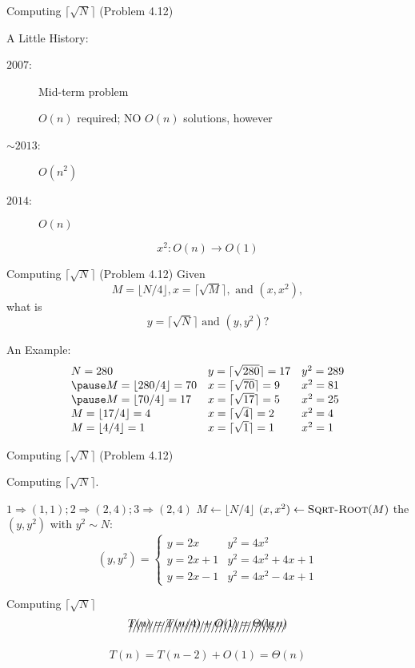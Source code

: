 \begin{frame}{Computing $\lceil \sqrt{N} \rceil$ (Problem 4.12)}
  \begin{block}{A Little History:}
    \begin{description}
	  \item[$2007$:] Mid-term problem \\
		\centerline{$O(n)$ required; NO $O(n)$ solutions, however}
	  \item[$\sim 2013$:] $O(n^2)$
	  \pause
	  \item[$2014$:] $O(n)$
    \end{description}
  \end{block}

  \pause
  \[
	x^2: O(n) \to O(1)
  \]
\end{frame}
\begin{frame}{Computing $\lceil \sqrt{N} \rceil$ (Problem 4.12)}
  Given
  \[ M = \lfloor N/4 \rfloor, x = \lceil \sqrt{M} \rceil,
    \textrm{ and } (x, x^2),
  \]
  what is
  \[ y = \lceil \sqrt{N} \rceil \textrm{ and } (y, y^2)? \]

  \pause
  \begin{exampleblock}{An Example:}
  \[
	\begin{array}{lll}
	  N = 280 & y = \lceil \sqrt{280} \rceil = 17 & y^2 = 289 \\ \pause
	  M = \lfloor 280/4 \rfloor = 70 & x = \lceil \sqrt{70} \rceil = 9 & x^2 = 81 \\ \pause
	  M = \lfloor 70/4 \rfloor = 17 & x = \lceil \sqrt{17} \rceil = 5 & x^2 = 25 \\
	  M = \lfloor 17/4 \rfloor = 4 & x = \lceil \sqrt{4} \rceil = 2 & x^2 = 4 \\
	  M = \lfloor 4/4 \rfloor = 1 & x = \lceil \sqrt{1} \rceil = 1 & x^2 = 1
	\end{array}
  \]
  \end{exampleblock}
\end{frame}
\begin{frame}{Computing $\lceil \sqrt{N} \rceil$ (Problem 4.12)}
  \begin{algorithm}[H]
    \caption{Computing $\lceil \sqrt{N} \rceil$.}
    \begin{algorithmic}[]
	      \State \Return $1 \Rightarrow (1,1); 2 \Rightarrow (2,4); 3 \Rightarrow (2,4)$
	    \EndIf
	    \State $M \gets \lfloor N/4 \rfloor$
	    \State $(x, x^2) \gets \textsc{Sqrt-Root}{(M)}$
		\State \Return the $(y, y^2)$ with $y^2 \sim N$:
           \[
			(y, y^2) = \left\{ \begin{array}{ll}
			y = 2x & y^2 = 4x^2 \\
			y = 2x + 1 & y^2 = 4x^2 + 4x + 1 \\
			y = 2x - 1 & y^2 = 4x^2 - 4x + 1
			\end{array} \right.
	      \]
	  \EndProcedure
    \end{algorithmic}
  \end{algorithm}
\end{frame}
\begin{frame}{Computing $\lceil \sqrt{N} \rceil$}
  \[ \xout{T(n) = T(n/4) + O(1) = \Theta(\lg n)} \]

  \[ T(n) = T(n - 2) + O(1) = \Theta(n) \]
\end{frame}
